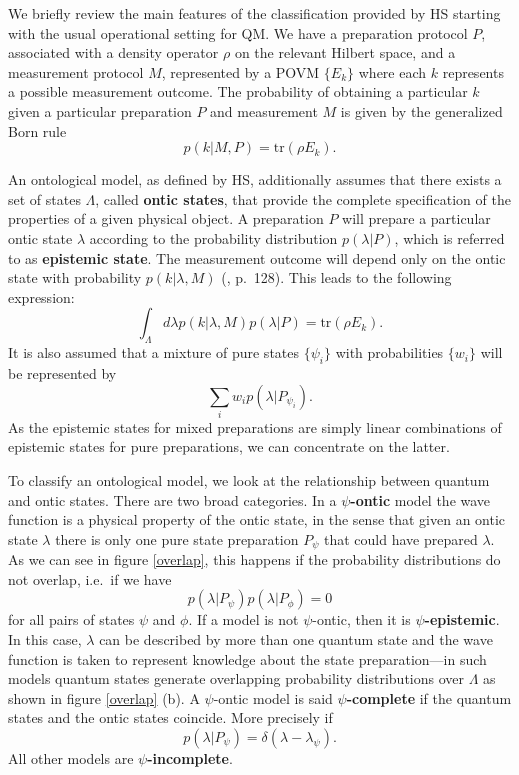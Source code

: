 \documentclass[twocolumn,prl,floatfix,superscriptaddress]{revtex4-2}
\begin{document}
We briefly review the main features of the classification provided by HS starting with the usual operational setting for QM. We have a preparation protocol $P$, associated with a density operator $\rho$ on the relevant Hilbert space, and a measurement protocol $M$, represented by a POVM $\{ E_k\}$ where each $k$ represents a possible measurement outcome. The probability of obtaining a particular $k$ given a particular preparation $P$ and measurement $M$ is given by the generalized Born rule
\begin{equation}
	p(k|M, P)=\textrm{tr}(\rho E_k).
\end{equation}

An ontological model, as defined by HS, additionally assumes that there exists a set of states $\Lambda$, called \textbf{ontic states}, that provide the complete specification of the properties of a given physical object. A preparation $P$ will prepare a particular ontic state $\lambda$ according to the probability distribution $p(\lambda | P)$, which is referred to as \textbf{epistemic state}. The measurement outcome will depend only on the ontic state with probability $p(k|\lambda, M)$ (\cite{Harrigan:2010}, p.\ 128). This leads to the following expression:
\begin{equation}
	\int_\Lambda d\lambda p(k|\lambda, M) p(\lambda| P)= \textrm{tr}(\rho E_k).
\end{equation}
It is also assumed that a mixture of pure states $\{ \psi_i \}$ with probabilities $\{ w_i \}$ will be represented by
\begin{equation}\label{epistemic_mixing}
	\sum_i  w_i p(\lambda| P_{\psi_i}).
\end{equation}
As the epistemic states for mixed preparations are simply linear combinations of epistemic states for pure preparations, we can concentrate on the latter.

To classify an ontological model, we look at the relationship between quantum and ontic states. There are two broad categories. In a \textbf{$\psi$-ontic} model the wave function is a physical property of the ontic state, in the sense that given an ontic state $\lambda$ there is only one pure state preparation $P_\psi$ that could have prepared $\lambda$. As we can see in figure \ref{overlap}, this happens if the probability distributions do not overlap, i.e.\ if we have
\begin{equation}\label{ontic_condition}
	p(\lambda | P_{\psi})p(\lambda|P_{\phi})=0
\end{equation}
for all pairs of states $\psi$ and $\phi$. If a model is not $\psi$-ontic, then it is \textbf{$\psi$-epistemic}. In this case, $\lambda$ can be described by more than one quantum state and the wave function is taken to represent knowledge about the state preparation---in such models quantum states generate overlapping probability distributions over $\Lambda$ as shown in figure \ref{overlap} (b). A $\psi$-ontic model is said \textbf{$\psi$-complete} if the quantum states and the ontic states coincide. More precisely if 
\begin{equation}\label{complete_condition}
	p(\lambda|P_\psi)=\delta(\lambda-\lambda_{\psi}).
\end{equation}
All other models are \textbf{$\psi$-incomplete}.
\end{document}
